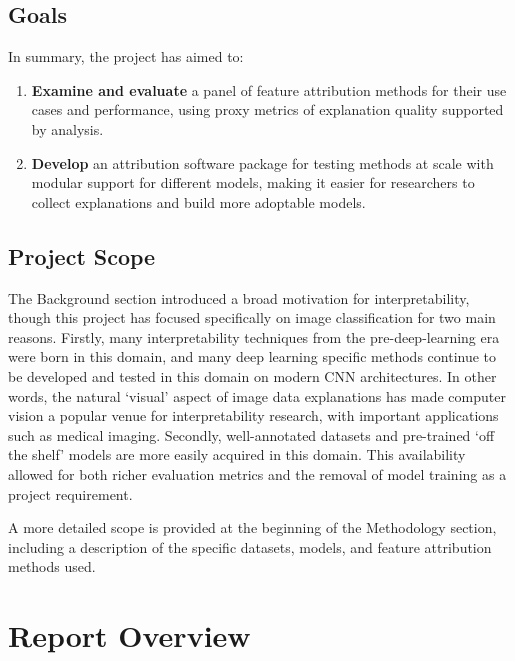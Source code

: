\documentclass[main]{subfiles}
\begin{document}
\subsection*{Goals}
In summary, the project has aimed to:
\begin{enumerate}
	\item \textbf{Examine and evaluate} a panel of feature attribution methods for their use cases and performance, using proxy metrics of explanation quality supported by analysis.

	\item \textbf{Develop} an attribution software package for testing methods at scale with modular support for different models, making it easier for researchers to collect explanations and build more adoptable models.
	
\end{enumerate}

\subsection*{Project Scope}

The Background section introduced a broad motivation for interpretability, though this project has focused specifically on image classification for two main reasons. 
Firstly, many interpretability techniques from the pre-deep-learning era were born in this domain, and many deep learning specific methods continue to be developed and tested in this domain on modern CNN architectures. In other words, the natural `visual' aspect of  image data explanations has made computer vision a popular venue for interpretability research, with important applications such as medical imaging. 
Secondly, well-annotated datasets and pre-trained `off the shelf' models are more easily acquired in this domain. This availability allowed for both richer evaluation metrics and the removal of model training as a project requirement.

A more detailed scope is provided at the beginning of the Methodology section, including a description of the specific datasets, models, and feature attribution methods used.

\newpage

\section{Report Overview}
\end{document}
